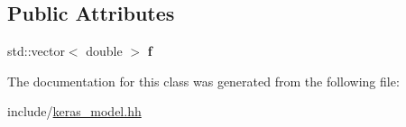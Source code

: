 \subsection*{Public Attributes}
\begin{DoxyCompactItemize}
\item 
\mbox{\label{classkeras_1_1_data_chunk_flat_abc3a87dfe7305e30116cb21a321583f9}} 
std\+::vector$<$ double $>$ {\bfseries f}
\end{DoxyCompactItemize}


The documentation for this class was generated from the following file\+:\begin{DoxyCompactItemize}
\item 
include/\mbox{\hyperlink{keras__model_8hh}{keras\+\_\+model.\+hh}}\end{DoxyCompactItemize}
